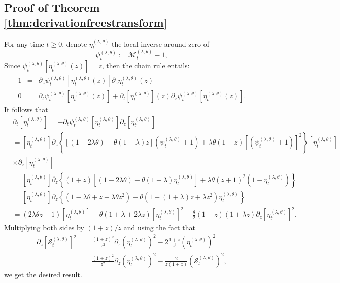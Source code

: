 \documentclass[12pt,reqno]{amsart}
\begin{document}
\subsection{Proof of Theorem \ref{thm:derivationfreestransform}}
For any time $t \geq 0$, denote $\eta_t^{(\lambda,\theta)}$ the local inverse around zero of 
\begin{equation*}
\psi_t^{(\lambda,\theta)} := \mathcal{M}_t^{(\lambda,\theta)}-1,
\end{equation*}
Since $\psi_t^{(\lambda,\theta)}[\eta_t^{(\lambda,\theta)}(z)] = z$, then the chain rule entails:
	\begin{eqnarray*}
		1 &=& \partial_z\psi_t^{(\lambda,\theta)}[\eta_t^{(\lambda,\theta)}(z)]\partial_z\eta_t^{(\lambda,\theta)}(z)
		\\
		0 &=& \partial_t\psi_t^{(\lambda,\theta)}[\eta_t^{(\lambda,\theta)}(z)] + \partial_t[\eta_t^{(\lambda,\theta)}](z)
		\partial_z\psi_t^{(\lambda,\theta)}[\eta_t^{(\lambda,\theta)}(z)].
	\end{eqnarray*}
	It follows that
	\begin{align*}
		 & \partial_t[\eta_t^{(\lambda,\theta)}]  =  -\partial_t\psi_t^{(\lambda,\theta)}[\eta_t^{(\lambda,\theta)}] \partial_z[\eta_t^{(\lambda,\theta)}]
		\\& =  [\eta_t^{(\lambda,\theta)}]  \partial_z \left\{
		[(1-2\lambda \theta)  -\theta(1-\lambda)z](\psi_t^{(\lambda,\theta)}+1)
		+\lambda \theta (1-z)[(\psi_t^{(\lambda,\theta)}+1)]^2\right\}
		[\eta_t^{(\lambda,\theta)}]                                                                                                                        \\& \times \partial_z[\eta_t^{(\lambda,\theta)}]
		\\& = [\eta_t^{(\lambda,\theta)}]
		\partial_z \left\{(1+z)\left[(1-2\lambda \theta)  -\theta(1-\lambda)\eta_t^{(\lambda,\theta)}\right]
		+\lambda \theta (z+1)^2 \left(1-\eta_t^{(\lambda,\theta)}\right)\right\}
		\\& = [\eta_t^{(\lambda,\theta)}]
		\partial_z \left\{(1-\lambda \theta +z +\lambda \theta z^2)
		-\theta(1+(1+\lambda)z +\lambda z^2)\eta_t^{(\lambda,\theta)}\right\}
		\\& = (2\lambda \theta z+1)[\eta_t^{(\lambda,\theta)}]
		-\theta(1+\lambda +2\lambda z) \left[\eta_t^{(\lambda,\theta)}\right]^2
		-\frac{\theta}{2}(1+z)(1+\lambda z) \partial_z \left[\eta_t^{(\lambda,\theta)}\right]^2.
	\end{align*}
	Multiplying both sides by $(1+z)/z$ and using the fact that
	\begin{align*}
		\partial_z\left[\mathcal{S}_t^{(\lambda,\theta)}\right]^2 & = \frac{(1+z)^2}{z^2}\partial_z \left(\eta_t^{(\lambda,\theta)}\right)^2
		-2\frac{1+z}{z^3}\left(\eta_t^{(\lambda,\theta)}\right)^2
		\\& = \frac{(1+z)^2}{z^2}\partial_z \left(\eta_t^{(\lambda,\theta)}\right)^2
		-\frac{2}{z(1+z)}\left(\mathcal{S}_t^{(\lambda,\theta)}\right)^2,
	\end{align*}
	we get the desired result.
\end{document}
